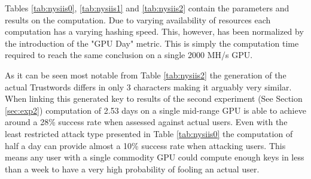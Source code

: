 Tables \ref{tab:nysiis0}, \ref{tab:nysiis1} and \ref{tab:nysiis2} contain the parameters and results on the computation. Due to varying availability of resources each computation has a varying hashing speed. This, however, has been normalized by the introduction of the "GPU Day" metric. This is simply the computation time required to reach the same conclusion on a single 2000 MH/s GPU. 

As it can be seen most notable from Table \ref{tab:nysiis2} the generation of the actual Trustwords differs in only 3 characters making it arguably very similar. When linking this generated key to results of the second experiment (See Section \ref{sec:exp2}) computation of 2.53 days on a single mid-range GPU is able to achieve around a 28\% success rate when assessed against actual users. Even with the least restricted attack type presented in Table \ref{tab:nysiis0} the computation of half a day can provide almost a 10\% success rate when attacking users. This means any user with a single commodity GPU could compute enough keys in less than a week to have a very high probability of fooling an actual user.
